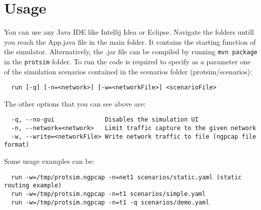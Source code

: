 \section{Usage}
You can use any Java IDE like Intellij Idea or Eclipse.
Navigate the folders untill you reach the App.java file in the main folder. It contains the starting function of the simulator.\newline
Alternatively, the .jar file can be compiled by running \texttt{mvn package} in the \texttt{protsim} folder.\newline
To run the code is required to specify as a parameter one of the simulation scenarios contained in the scenarios folder (protsim/scenarios):
\begin{verbatim}
  run [-q] [-n=<network>] [-w=<networkFile>] <scenarioFile>
\end{verbatim}
The other options that you can see above are:
\begin{verbatim}
  -q, --no-gui              Disables the simulation UI
  -n, --network=<network>   Limit traffic capture to the given network
  -w, --write=<networkFile> Write network traffic to file (ngpcap file format)
\end{verbatim}
Some usage examples can be:
\begin{verbatim}
  run -w=/tmp/protsim.ngpcap -n=net1 scenarios/static.yaml (static routing example)
  run -w=/tmp/protsim.ngpcap -n=t1 scenarios/simple.yaml
  run -w=/tmp/protsim.ngpcap -n=t1 -q scenarios/demo.yaml
\end{verbatim}
